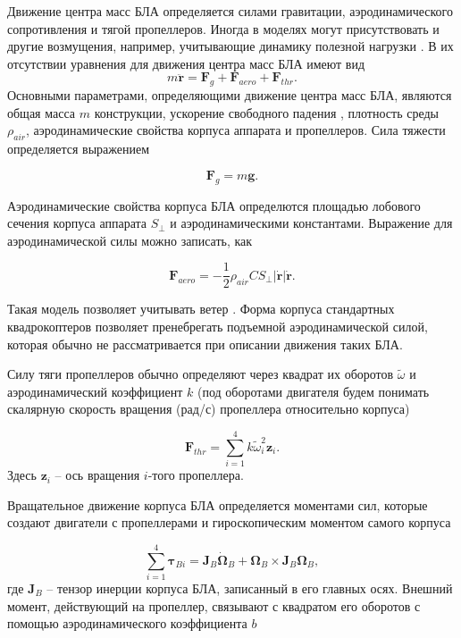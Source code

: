 Движение центра масс БЛА определяется силами гравитации, аэродинамического сопротивления и тягой пропеллеров.
Иногда в моделях могут присутствовать и другие возмущения, например, учитывающие динамику полезной нагрузки \cite{Lim01}.
В их отсутствии уравнения для движения центра масс БЛА имеют вид
\begin{equation} \label{eq:common_traslational_motion}
m \ddot{\bm{r}} = \bm{F}_g + \bm{F}_{aero} + \bm{F}_{thr}.
\end{equation}
Основными параметрами, определяющими движение центра масс БЛА, являются общая масса {$m$} конструкции, ускорение свободного падения , плотность среды {$\rho_{air}$}, аэродинамические свойства корпуса аппарата и пропеллеров. Сила тяжести определяется выражением

\begin{equation} \label{eq:gravity_force}
\bm{F}_g = m\bm{g}.
\end{equation}

Аэродинамические свойства корпуса БЛА определются площадью лобового сечения корпуса аппарата {$S_{\perp}$} и аэродинамическими константами. Выражение для аэродинамической силы можно записать, как \cite{Biard01}

\begin{equation} \label{eq:aerodynamic_force}
\bm{F}_{aero} = - \frac{1}{2} \rho_{air} C S_{\perp} |\dot{\bm{r}}| \dot{\bm{r}}.
\end{equation}

Такая модель позволяет учитывать ветер \cite{Bannwarth01}. Форма корпуса стандартных квадрокоптеров позволяет пренебрегать подъемной аэродинамической силой, которая обычно не рассматривается при описании движения таких БЛА.

Силу тяги пропеллеров обычно определяют через квадрат их оборотов $\tilde\omega$ и аэродинамический коэффициент $k$ \cite{Falconi01} (под оборотами двигателя будем понимать скалярную скорость вращения (рад/с) пропеллера относительно корпуса)

\begin{equation} \label{eq:thrust_force}
\bm{F}_{thr} = \sum_{i=1}^{4}{ { k \tilde\omega^2_i \bm{z}_i}.}
\end{equation}
Здесь $\bm{z}_i$ -- ось вращения $i$-того пропеллера.
 
Вращательное движение корпуса БЛА определяется моментами сил, которые создают двигатели с пропеллерами и гироскопическим моментом самого корпуса

\begin{equation} \label{eq:common_rotational_motion}
\sum_{i=1}^{4}{\bm{\tau}_{Bi}} = \bm{J}_B\dot{\bm{\Omega}}_B + \bm{\Omega}_B \times  \bm{J}_B{\bm{\Omega}_B},
\end{equation}
где $\bm{J}_B$ -- тензор инерции корпуса БЛА, записанный в его главных осях.
Внешний момент, действующий на пропеллер, связывают с квадратом его оборотов с помощью аэродинамического коэффициента $b$ \cite{Ryll01}

